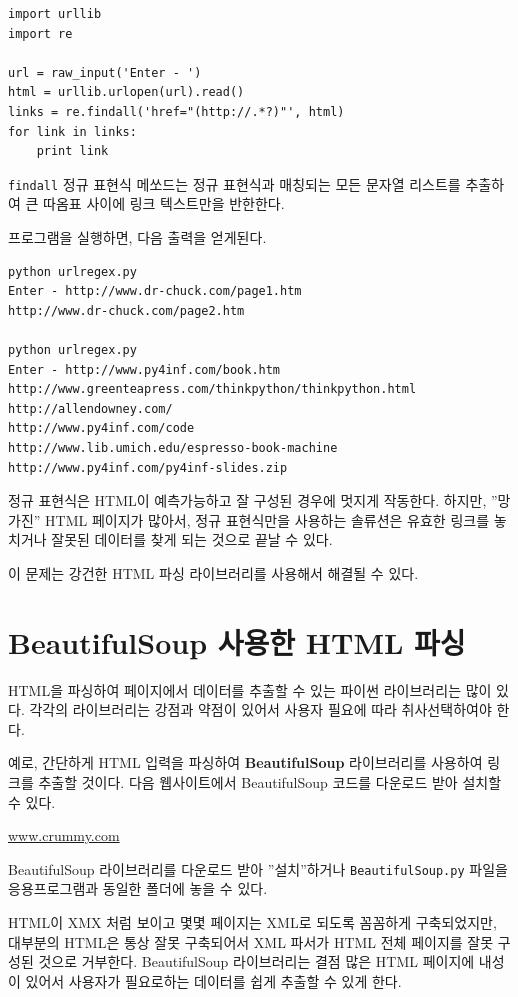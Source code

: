
\beforeverb
\begin{verbatim}
import urllib
import re

url = raw_input('Enter - ')
html = urllib.urlopen(url).read()
links = re.findall('href="(http://.*?)"', html)
for link in links:
    print link
\end{verbatim}
\afterverb
%

{\tt findall} 정규 표현식 메쏘드는 정규 표현식과 매칭되는 모든 문자열 리스트를 추출하여 큰 따옴표 사이에 링크 텍스트만을 반한한다.

프로그램을 실행하면, 다음 출력을 얻게된다.

\beforeverb
\begin{verbatim}
python urlregex.py 
Enter - http://www.dr-chuck.com/page1.htm
http://www.dr-chuck.com/page2.htm

python urlregex.py 
Enter - http://www.py4inf.com/book.htm
http://www.greenteapress.com/thinkpython/thinkpython.html
http://allendowney.com/
http://www.py4inf.com/code
http://www.lib.umich.edu/espresso-book-machine
http://www.py4inf.com/py4inf-slides.zip
\end{verbatim}
\afterverb
%

정규 표현식은 HTML이 예측가능하고 잘 구성된 경우에 멋지게 작동한다.
하지만, ''망가진'' HTML 페이지가 많아서, 정규 표현식만을 사용하는 솔류션은 유효한 링크를 놓치거나 잘못된 데이터를 찾게 되는 것으로 끝날 수 있다.

이 문제는 강건한 HTML 파싱 라이브러리를 사용해서 해결될 수 있다.

\section{BeautifulSoup 사용한 HTML 파싱}

HTML을 파싱하여 페이지에서 데이터를 추출할 수 있는 파이썬 라이브러리는 많이 있다.
각각의 라이브러리는 강점과 약점이 있어서 사용자 필요에 따라 취사선택하여야 한다.

예로, 간단하게 HTML 입력을 파싱하여 {\bf BeautifulSoup} 라이브러리를 사용하여 링크를 추출할 것이다.
다음 웹사이트에서 BeautifulSoup 코드를 다운로드 받아 설치할 수 있다.

\url{www.crummy.com}

BeautifulSoup 라이브러리를 다운로드 받아 ''설치''하거나 {\tt BeautifulSoup.py} 파일을 응용프로그램과 동일한 폴더에 놓을 수 있다.

HTML이 XMX 처럼 보이고 몇몇 페이지는 XML로 되도록 꼼꼼하게 구축되었지만, 대부분의 HTML은 통상 잘못 구축되어서 XML 파서가 HTML 전체 페이지를 
잘못 구성된 것으로 거부한다. BeautifulSoup 라이브러리는 결점 많은 HTML 페이지에 내성이 있어서 사용자가 필요로하는 데이터를 쉽게 추출할 수 있게 한다.

